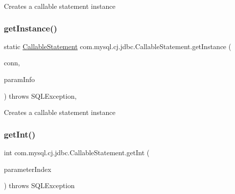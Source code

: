 Creates a callable statement instance \mbox{\label{classcom_1_1mysql_1_1cj_1_1jdbc_1_1_callable_statement_a0b4b36b3823d177a749e09a4a32971a9}} 
\subsubsection{\texorpdfstring{get\+Instance()}{getInstance()}\hspace{0.1cm}{\footnotesize\ttfamily [2/2]}}
{\footnotesize\ttfamily static \mbox{\hyperlink{classcom_1_1mysql_1_1cj_1_1jdbc_1_1_callable_statement}{Callable\+Statement}} com.\+mysql.\+cj.\+jdbc.\+Callable\+Statement.\+get\+Instance (\begin{DoxyParamCaption}\item[{\mbox{\hyperlink{interfacecom_1_1mysql_1_1cj_1_1jdbc_1_1_jdbc_connection}{Jdbc\+Connection}}}]{conn,  }\item[{\mbox{\hyperlink{classcom_1_1mysql_1_1cj_1_1jdbc_1_1_callable_statement_1_1_callable_statement_param_info}{Callable\+Statement\+Param\+Info}}}]{param\+Info }\end{DoxyParamCaption}) throws S\+Q\+L\+Exception\hspace{0.3cm}{\ttfamily [static]}, {\ttfamily [protected]}}

Creates a callable statement instance \mbox{\label{classcom_1_1mysql_1_1cj_1_1jdbc_1_1_callable_statement_ae1c1a3f79f99f2dd61c551a5579f9d00}} 
\subsubsection{\texorpdfstring{get\+Int()}{getInt()}\hspace{0.1cm}{\footnotesize\ttfamily [1/2]}}
{\footnotesize\ttfamily int com.\+mysql.\+cj.\+jdbc.\+Callable\+Statement.\+get\+Int (\begin{DoxyParamCaption}\item[{int}]{parameter\+Index }\end{DoxyParamCaption}) throws S\+Q\+L\+Exception}

